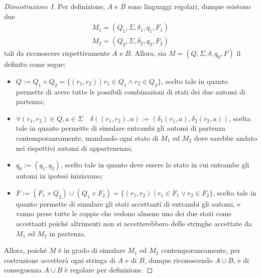 \documentclass[a4paper, 12pt]{report}
\begin{document}
    \begin{proof}[Dimostrazione I]
        Per definizione, $A$ e $B$ sono linguaggi regolari, dunque esistono due \DFA $$\left. \begin{array}{c}M_1 = (Q_1, \Sigma, \delta_1, q_1, F_1) \\ M_2 = (Q_2, \Sigma, \delta_2, q_2, F_2)\end{array} \right.$$ tali da riconoscere rispettivamente $A$ e $B$. Allora, sia $M = (Q, \Sigma, \delta, q_0, F)$ il \DFA definito come segue:

        \begin{itemize}
            \item $Q := Q_1 \times Q_2 = \{(r_1, r_2) \mid r_1 \in Q_1 \land r_2 \in Q_2\}$, scelto tale in quanto permette di avere tutte le possibili combinazioni di stati dei due automi di partenza;
            \item $\forall (r_1, r_2) \in Q, a \in \Sigma \quad \delta((r_1, r_2), a) := (\delta_1(r_1, a), \delta_2(r_2, a))$, scelta tale in quanto permette di simulare entrambi gli automi di partenza contemporaneamente, mandando ogni stato di $M_1$ ed $M_2$ dove sarebbe andato nei rispettivi automi di appartenenza;
            \item $q_0 := (q_1, q_2)$, scelto tale in quanto deve essere lo stato in cui entrambe gli automi in ipotesi iniziavano;
            \item $F := (F_1 \times Q_2) \cup (Q_1 \times F_2) = \{(r_1, r_2) \mid r_1 \in F_1 \lor r_2 \in F_2\}$, scelto tale in quanto permette di simulare gli stati accettanti di entrambi gli automi, e vanno prese tutte le coppie che vedono almeno uno dei due stati come accettanti poiché altrimenti non si accetterebbero delle stringhe accettate da $M_1$ ed $M_2$ in partenza.
        \end{itemize}

        Allora, poiché $M$ è in grado di simulare $M_1$ ed $M_2$ contemporaneamente, per costruzione accetterà ogni stringa di $A$ e di $B$, dunque riconoscendo $A \cup B$, e di conseguenza $A \cup B$ è regolare per definizione.
    \end{proof}
\end{document}
